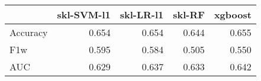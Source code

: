 \begin{tabular}{lrrrr}
\toprule
{} &  skl-SVM-l1 &  skl-LR-l1 &  skl-RF &  xgboost \\
\midrule
Accuracy &       0.654 &      0.654 &   0.644 &    0.655 \\
F1w      &       0.595 &      0.584 &   0.505 &    0.550 \\
AUC      &       0.629 &      0.637 &   0.633 &    0.642 \\
\bottomrule
\end{tabular}
